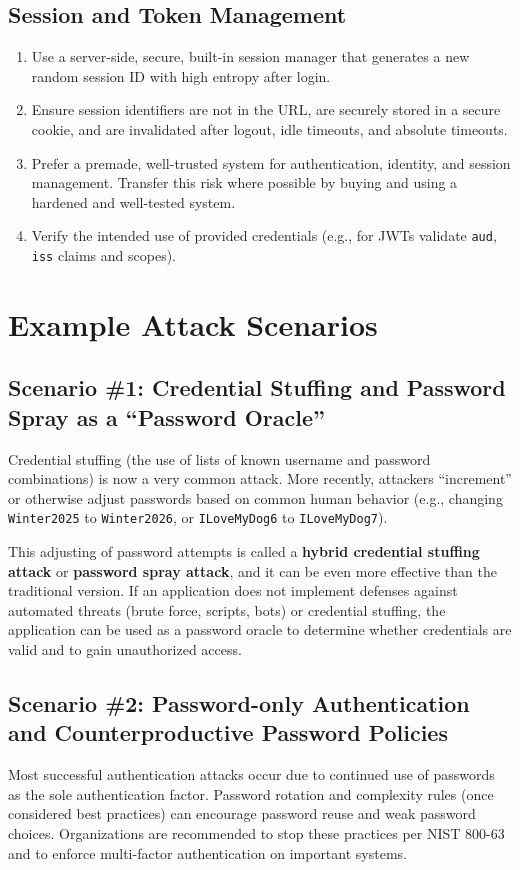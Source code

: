\documentclass[11pt]{article}
\begin{document}
\subsection{Session and Token Management}
\begin{enumerate}[resume]
  \item Use a server-side, secure, built-in session manager that generates a new random session ID with high entropy after login.
  \item Ensure session identifiers are not in the URL, are securely stored in a secure cookie, and are invalidated after logout, idle timeouts, and absolute timeouts.
  \item Prefer a premade, well-trusted system for authentication, identity, and session management. Transfer this risk where possible by buying and using a hardened and well-tested system.
  \item Verify the intended use of provided credentials (e.g., for JWTs validate \texttt{aud}, \texttt{iss} claims and scopes).
\end{enumerate}

\section{Example Attack Scenarios}

\subsection{Scenario \#1: Credential Stuffing and Password Spray as a ``Password Oracle''}
Credential stuffing (the use of lists of known username and password combinations) is now a very common attack. More recently, attackers ``increment'' or otherwise adjust passwords based on common human behavior (e.g., changing \texttt{Winter2025} to \texttt{Winter2026}, or \texttt{ILoveMyDog6} to \texttt{ILoveMyDog7}).

This adjusting of password attempts is called a \textbf{hybrid credential stuffing attack} or \textbf{password spray attack}, and it can be even more effective than the traditional version. If an application does not implement defenses against automated threats (brute force, scripts, bots) or credential stuffing, the application can be used as a password oracle to determine whether credentials are valid and to gain unauthorized access.

\subsection{Scenario \#2: Password-only Authentication and Counterproductive Password Policies}
Most successful authentication attacks occur due to continued use of passwords as the sole authentication factor. Password rotation and complexity rules (once considered best practices) can encourage password reuse and weak password choices. Organizations are recommended to stop these practices per NIST 800-63 and to enforce multi-factor authentication on important systems.
\end{document}
